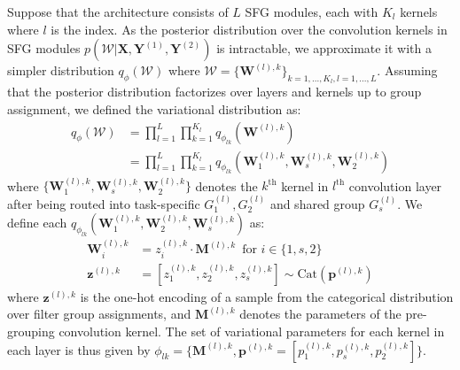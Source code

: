 Suppose that the architecture consists of $L$ SFG modules, each with $K_l$ kernels where $l$ is the index. As the posterior distribution over the convolution kernels in SFG modules $p(\mathcal{W}|\textbf{X}, \mathbf{Y}^{(1)}, \mathbf{Y}^{(2)})$ is intractable, we approximate it with a simpler distribution $q_{\phi}(\mathcal{W})$ where $\mathcal{W}=\{\mathbf{W}^{(l),k}\}_{k=1,...,K_{l},l=1,...,L}$. Assuming that the posterior distribution factorizes over layers and kernels up to group assignment, we defined the variational distribution as:
\begin{align*}
q_{\phi}(\mathcal{W}) &= \prod_{l=1}^{L}\prod_{k=1}^{K_{l}} q_{\phi_{lk}}(\mathbf{W}^{(l),k}) \\
&= \prod_{l=1}^{L}\prod_{k=1}^{K_{l}} q_{\phi_{lk}}(\mathbf{W}^{(l),k}_1,\mathbf{W}^{(l),k}_{s}, \mathbf{W}^{(l),k}_{2})
\end{align*}
where $\{\mathbf{W}^{(l),k}_1,\mathbf{W}^{(l),k}_{s}, \mathbf{W}^{(l),k}_{2}\}$ denotes the $k^{\text{th}}$ kernel in $l^{\text{th}}$ convolution layer after being routed into task-specific $G^{(l)}_1, G^{(l)}_2$ and shared group $G^{(l)}_{s}$. We define each $q_{\phi_{lk}}(\mathbf{W}^{(l),k}_1,\mathbf{W}^{(l),k}_2, \mathbf{W}^{(l),k}_{s})$ as: 
\begin{align}
\mathbf{W}^{(l),k}_{i} &= z^{(l),k}_{i}\cdot\mathbf{M}^{(l),k}\, \,\,\text{for } i \in\{1,s,2\}\\
\mathbf{z}^{(l),k}&=[z^{(l),k}_{1}, z^{(l),k}_{2},  z^{(l),k}_{s}] \sim \text{Cat}(\mathbf{p}^{(l),k}) \label{eq:sample_cat}
\end{align}
where $\mathbf{z}^{(l),k}$ is the one-hot encoding of a sample from the categorical distribution over filter group assignments, and $\mathbf{M}^{(l),k}$ denotes the parameters of the pre-grouping convolution kernel. The set of variational parameters for each kernel in each layer is thus given by $\phi_{lk} = \{\mathbf{M}^{(l),k}, \mathbf{p}^{(l),k}=[p^{(l),k}_1, p^{(l),k}_{s}, p^{(l),k}_2]\}$. 

